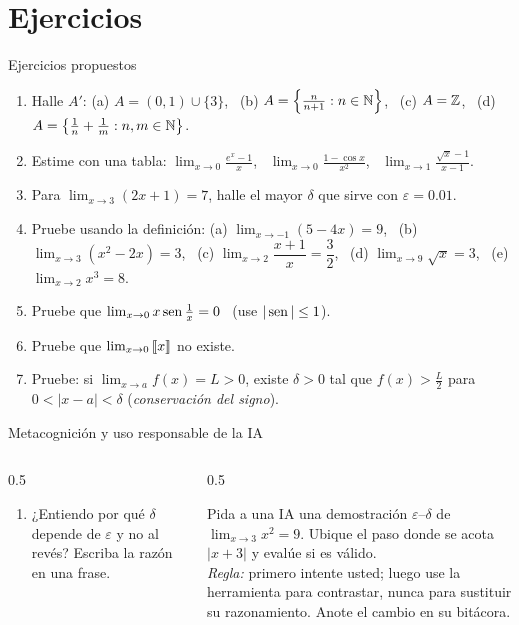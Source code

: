 \documentclass[10pt,aspectratio=169]{beamer}
\begin{document}
\section{Ejercicios}

\begin{frame}{Ejercicios propuestos}
  \small
  \begin{ejercicio}
    \begin{enumerate}
      \item Halle $A'$: (a) $A=(0,1)\cup\{3\}$, \ (b) $A=\left\{\frac{n}{n+1}:n\in\mathbb{N}\right\}$, \ (c) $A=\mathbb{Z}$, \ (d) $A=\left\{\frac1n+\frac1m:n,m\in\mathbb{N}\right\}$.
      \item Estime con una tabla: $\displaystyle\lim_{x\to0}\frac{e^x-1}{x}$, \ $\displaystyle\lim_{x\to0}\frac{1-\cos x}{x^2}$, \ $\displaystyle\lim_{x\to1}\frac{\sqrt x-1}{x-1}$.
      \item Para $\lim_{x\to3}(2x+1)=7$, halle el mayor $\delta$ que sirve con $\varepsilon=0.01$.
      \item Pruebe usando la definición: (a) $\lim_{x\to-1}(5-4x)=9$, \ (b) $\lim_{x\to3}(x^2-2x)=3$, \ (c) $\lim_{x\to2}\dfrac{x+1}{x}=\dfrac32$,
        \ (d) $\lim_{x\to9}\sqrt x=3$, \ (e) $\lim_{x\to2}x^3=8$.
      \item Pruebe que $\lim_{x\to0}x\operatorname{sen}\frac1x=0$ \ (use $|\operatorname{sen}|\le1$).
      \item Pruebe que $\lim_{x\to0}\left\llbracket x\right\rrbracket$ no existe.
      \item Pruebe: si $\lim_{x\to a}f(x)=L>0$, existe $\delta>0$ tal que $f(x)>\frac L2$ para $0<|x-a|<\delta$ (\emph{conservación del signo}).
    \end{enumerate}
  \end{ejercicio}
\end{frame}

\begin{frame}{Metacognición y uso responsable de la IA}
  \small
  \begin{columns}[t]
    \begin{column}{0.5\textwidth}
      \begin{metacog}
        \begin{enumerate}
          \metacomun
          \item ¿Entiendo por qué $\delta$ depende de $\varepsilon$ y no al revés? Escriba la razón en una frase.
        \end{enumerate}
      \end{metacog}
    \end{column}
    \begin{column}{0.5\textwidth}
      \begin{iabox}
        Pida a una IA una demostración $\varepsilon$--$\delta$ de $\lim_{x\to3}x^2=9$. Ubique el paso donde se acota $|x+3|$ y evalúe si es válido.\\[2pt]
        \textit{Regla:} primero intente usted; luego use la herramienta para contrastar, nunca para sustituir su razonamiento. Anote el cambio en su bitácora.
      \end{iabox}
    \end{column}
  \end{columns}
\end{frame}
\end{document}
